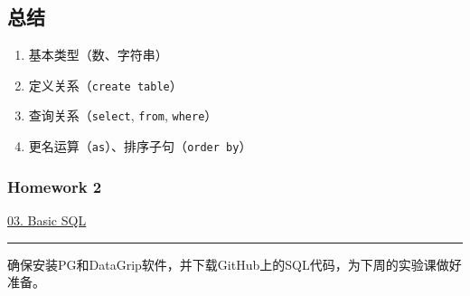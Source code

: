 \documentclass[aspectratio=169, 14pt]{beamer}
\begin{document}
\begin{frame}
    \section{\textcolor{darkmidnightblue}{总结}}  
\begin{enumerate}
    \item 基本类型（数、字符串）
    \item 定义关系（\texttt{create table}）
    \item 查询关系（\texttt{select}, \texttt{from}, \texttt{where}）
    \item 更名运算（\texttt{as}）、排序子句（\texttt{order by}）    
\end{enumerate}
\end{frame}
\begin{frame}
    \frametitle{Homework 2}
\href{https://github.com/ChenZhongPu/db-swufe/tree/master/03_basic_sql}{03. Basic SQL}

\noindent\rule{\textwidth}{1pt}

确保安装PG和DataGrip软件，并下载GitHub上的SQL代码，为下周的实验课做好准备。

\end{frame}
\end{document}
